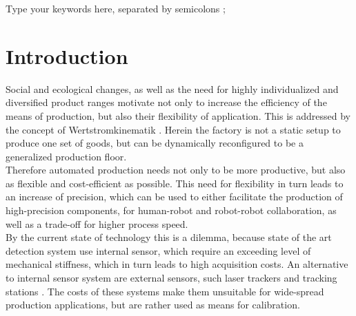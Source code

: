 \documentclass[5p,times,procedia]{elsarticle}
\begin{document}
\begin{frontmatter}
	\begin{keyword}
		Type your keywords here, separated by semicolons ;
		
		
		
		
	\end{keyword}
	
\end{frontmatter}



\section{Introduction}
%
%
%
%
%
%
%
Social and ecological changes, as well as the need for
highly individualized and diversified product ranges
motivate not only to increase the efficiency of the means
of production, but also their flexibility of application.
This is addressed by the concept of Wertstromkinematik \cite{Muehlbeier2020}.
Herein the factory is not a static setup to produce
one set of goods, but can be dynamically reconfigured to be a generalized production floor.\\
Therefore automated production needs not only to
be more productive, but also as flexible and cost-efficient as possible. This need for flexibility in turn leads to an increase of precision, which can be used to either facilitate the production of high-precision components, for human-robot and robot-robot collaboration, as well as a trade-off for higher process speed.\\
By the current state of technology this is a dilemma, because state of the art detection system use internal sensor, which require an exceeding level of mechanical stiffness, which in turn leads to high
acquisition costs. An alternative to internal sensor system are external sensors, such laser trackers and tracking stations \cite{Moeller17, Yang17}. The costs of these systems make them unsuitable for wide-spread production applications, but are rather used as means for calibration.\\
\end{document}

